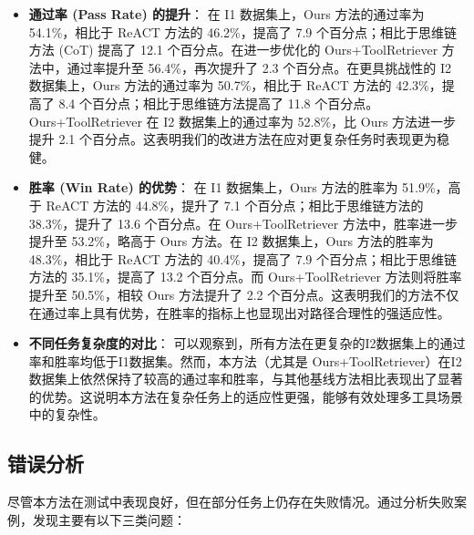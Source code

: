 \begin{itemize}
    \item \textbf{通过率 (Pass Rate) 的提升}：
    在 I1 数据集上，Ours 方法的通过率为 54.1\%，相比于 ReACT 方法的 46.2\%，提高了 7.9 个百分点；相比于思维链方法 (CoT) 提高了 12.1 个百分点。在进一步优化的 Ours+ToolRetriever 方法中，通过率提升至 56.4\%，再次提升了 2.3 个百分点。在更具挑战性的 I2 数据集上，Ours 方法的通过率为 50.7\%，相比于 ReACT 方法的 42.3\%，提高了 8.4 个百分点；相比于思维链方法提高了 11.8 个百分点。Ours+ToolRetriever 在 I2 数据集上的通过率为 52.8\%，比 Ours 方法进一步提升 2.1 个百分点。这表明我们的改进方法在应对更复杂任务时表现更为稳健。

    \item \textbf{胜率 (Win Rate) 的优势}：
    在 I1 数据集上，Ours 方法的胜率为 51.9\%，高于 ReACT 方法的 44.8\%，提升了 7.1 个百分点；相比于思维链方法的 38.3\%，提升了 13.6 个百分点。在 Ours+ToolRetriever 方法中，胜率进一步提升至 53.2\%，略高于 Ours 方法。在 I2 数据集上，Ours 方法的胜率为 48.3\%，相比于 ReACT 方法的 40.4\%，提高了 7.9 个百分点；相比于思维链方法的 35.1\%，提高了 13.2 个百分点。而 Ours+ToolRetriever 方法则将胜率提升至 50.5\%，相较 Ours 方法提升了 2.2 个百分点。这表明我们的方法不仅在通过率上具有优势，在胜率的指标上也显现出对路径合理性的强适应性。

    \item \textbf{不同任务复杂度的对比}：
    可以观察到，所有方法在更复杂的I2数据集上的通过率和胜率均低于I1数据集。然而，本方法（尤其是 Ours+ToolRetriever）在I2数据集上依然保持了较高的通过率和胜率，与其他基线方法相比表现出了显著的优势。这说明本方法在复杂任务上的适应性更强，能够有效处理多工具场景中的复杂性。
\end{itemize}

\subsection{错误分析}
\label{subsec:error_analysis}

尽管本方法在测试中表现良好，但在部分任务上仍存在失败情况。通过分析失败案例，发现主要有以下三类问题：

